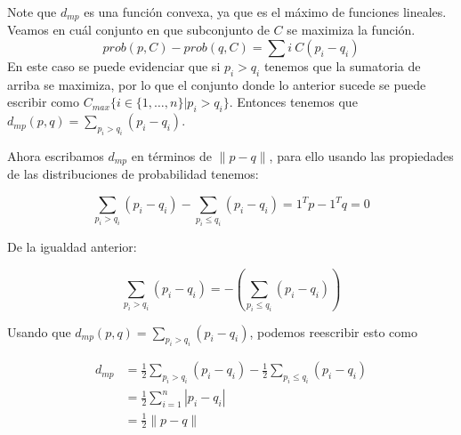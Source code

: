 \documentclass[12pt, oneside]{article}%
\begin{document}
\begin{enumerate}
Note que $d_{mp}$ es una función convexa, ya que es el máximo de funciones lineales. 
Veamos en cuál conjunto en que subconjunto de $C$ se maximiza la función.
$$prob(p,C)- prob(q,C) = \sum{i \ C} (p_i-q_i)$$
En este caso se puede evidenciar que si $p_i > q_i$ tenemos que la sumatoria de arriba se maximiza, por lo que el conjunto donde lo anterior sucede se puede escribir como $C_{max} \{i \in \{1,\dots,n\}|p_i > q_i \}$. Entonces tenemos que $d_{mp}(p,q) = \sum_{p_i>q_i}(p_i-q_i)$. 

Ahora escribamos $d_{mp}$ en términos de $\|p-q\|$, para ello usando las propiedades de las distribuciones de probabilidad tenemos:

$$\sum_{p_i>q_i}(p_i-q_i)- \sum_{p_i\leq q_i}(p_i-q_i) = 1^T p- 1^T q = 0$$ 

De la igualdad anterior: 

$$\sum_{p_i>q_i}(p_i-q_i) = - (\sum_{p_i\leq q_i}(p_i-q_i)) $$

Usando que $d_{mp}(p,q) = \sum_{p_i>q_i}(p_i-q_i)$, podemos reescribir esto como 

\begin{align}
    d_{mp}  &= \frac{1}{2}\sum_{p_i>q_i}(p_i-q_i) - \frac{1}{2}\sum_{p_i\leq q_i}(p_i-q_i) \\
            &= \frac{1}{2}\sum_{i=1}^n |p_i-q_i| \\
            &=  \frac{1}{2}\|p-q\|
\end{align}


\end{enumerate}
\end{document}
